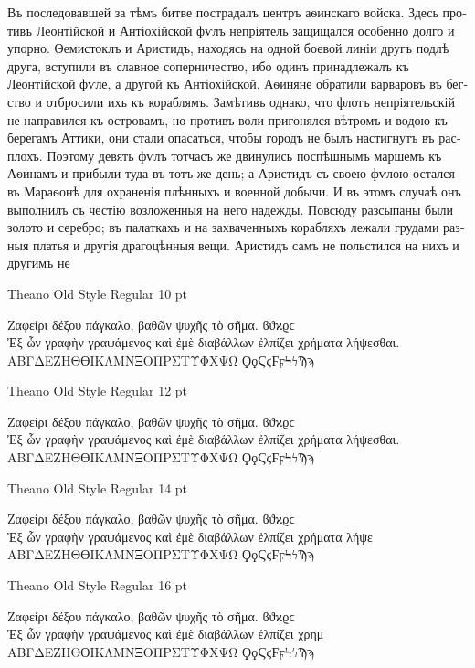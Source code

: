 \documentclass[12pt,a4paper,openany]{article}
\newcommand{\pageheader}[1]{%
	\clearpage
	\pagestyle{fancy}
	\lhead{\LARGE\bfseries#1}
	\cfoot{}
}
\newcommand{\sampletitle}[1]{%
        \addvspace{\bigskipamount}
        \noindent#1
        \smallskip
}
\begin{document}
\begin{otherlanguage}{russian}
\parfillskip=0pt
\fontsize{14}{18}\selectfont

\noindent Въ последовавшей за тѣмъ битве пострадалъ центръ аѳинскаго
войска. Здесь противъ Леонтійской и Антіохійской фѵлъ непріятель
защищался особенно долго и упорно. Ѳемистоклъ и Аристидъ, находясь на
одной боевой линіи другъ подлѣ друга, вступили въ славное соперничество,
ибо одинъ принадлежалъ къ Леонтійской фѵле, а другой къ Антіохійской.
Аѳиняне обратили варваровъ въ бегство и отбросили ихъ къ кораблямъ. Замѣтивъ
однако, что флотъ непріятельскій не направился къ островамъ, но противъ
воли пригонялся вѣтромъ и водою къ берегамъ Аттики, они стали опасаться,
чтобы городъ не былъ настигнутъ въ расплохъ. Поэтому девять фѵлъ тотчасъ
же двинулись поспѣшнымъ маршемъ къ Аѳинамъ и прибыли туда въ тотъ же день;
а Аристидъ съ своею фѵлою остался въ Мараѳонѣ для охраненія плѣнныхъ и
военной добычи. И въ этомъ случаѣ онъ выполнилъ съ честію возложенныя на
него надежды. Повсюду разсыпаны были золото и серебро; въ палаткахъ и на
захваченныхъ корабляхъ лежали грудами разныя платья и другія драгоцѣнныя
вещи. Аристидъ самъ не польстился на нихъ и другимъ не

\end{otherlanguage}

\pageheader{Theano Old Style~--- Greek Characters}

\hspace\parindent\begin{minipage}[t]{\textwidth-\parindent}

\sampletitle{Theano Old Style Regular 10 pt}

{\fontsize{10}{12}\selectfont\noindent
Ζαφείρι δέξου πάγκαλο, βαθῶν ψυχῆς τὸ σῆμα. ϐϑϰϱϲ\\
Ἐξ ὧν γραφὴν γραψάμενος καὶ ἐμὲ διαβάλλων ἐλπίζει χρήματα λήψεσθαι.\\
ΑΒΓΔΕΖΗΘϴΙΚΛΜΝΞΟΠΡΣΤΥΦΧΨΩ ϘϙϚϛϜϝϞϟϠϡ
}

\sampletitle{Theano Old Style Regular 12 pt}

{\fontsize{12}{14}\selectfont\noindent
Ζαφείρι δέξου πάγκαλο, βαθῶν ψυχῆς τὸ σῆμα. ϐϑϰϱϲ\\
Ἐξ ὧν γραφὴν γραψάμενος καὶ ἐμὲ διαβάλλων ἐλπίζει χρήματα λήψεσθαι.\\
ΑΒΓΔΕΖΗΘϴΙΚΛΜΝΞΟΠΡΣΤΥΦΧΨΩ ϘϙϚϛϜϝϞϟϠϡ
}

\sampletitle{Theano Old Style Regular 14 pt}

{\fontsize{14}{18}\selectfont\noindent
Ζαφείρι δέξου πάγκαλο, βαθῶν ψυχῆς τὸ σῆμα. ϐϑϰϱϲ\\
Ἐξ ὧν γραφὴν γραψάμενος καὶ ἐμὲ διαβάλλων ἐλπίζει χρήματα λήψε\\
ΑΒΓΔΕΖΗΘϴΙΚΛΜΝΞΟΠΡΣΤΥΦΧΨΩ ϘϙϚϛϜϝϞϟϠϡ
}

\sampletitle{Theano Old Style Regular 16 pt}

{\fontsize{16}{20}\selectfont\noindent
Ζαφείρι δέξου πάγκαλο, βαθῶν ψυχῆς τὸ σῆμα. ϐϑϰϱϲ\\
Ἐξ ὧν γραφὴν γραψάμενος καὶ ἐμὲ διαβάλλων ἐλπίζει χρημ\\
ΑΒΓΔΕΖΗΘϴΙΚΛΜΝΞΟΠΡΣΤΥΦΧΨΩ ϘϙϚϛϜϝϞϟϠϡ
}

\end{minipage}
\end{document}
